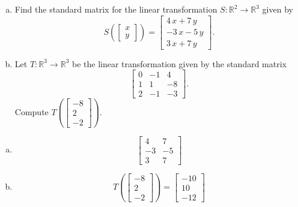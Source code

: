 
\begin{exerciseStatement}

\begin{enumerate}[(a)]
\item Find the standard matrix for the linear transformation \(S:\mathbb{R}^ 2  \to \mathbb{R}^ 3 \) given by \[S\left(  \left[\begin{array}{c}
x \\
y
\end{array}\right]  \right) =  \left[\begin{array}{c}
4 \, x + 7 \, y \\
-3 \, x - 5 \, y \\
3 \, x + 7 \, y
\end{array}\right] .\]
\item Let \(T:\mathbb{R}^ 3  \to \mathbb{R}^ 3 \) be the linear transformation given by the standard matrix \[ \left[\begin{array}{ccc}
0 & -1 & 4 \\
1 & 1 & -8 \\
2 & -1 & -3
\end{array}\right] .\] Compute \(T\left( \left[\begin{array}{c}
-8 \\
2 \\
-2
\end{array}\right]  \right)\). 
\end{enumerate}
    
\end{exerciseStatement}
    
\begin{exerciseAnswer} 

\begin{enumerate}[(a)]
\item \[ \left[\begin{array}{cc}
4 & 7 \\
-3 & -5 \\
3 & 7
\end{array}\right] \]
\item \[T\left( \left[\begin{array}{c}
-8 \\
2 \\
-2
\end{array}\right]  \right)= \left[\begin{array}{c}
-10 \\
10 \\
-12
\end{array}\right] \]
\end{enumerate}
    
\end{exerciseAnswer}
    

